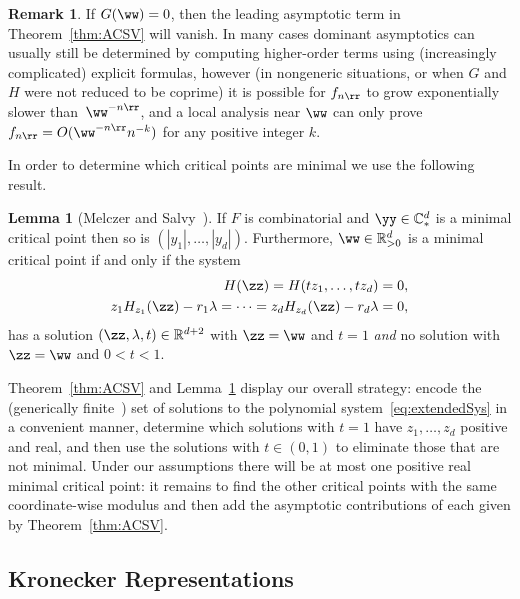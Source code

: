\documentclass[a4paper]{amsart}
\theoremstyle{definition}
\newtheorem{remark}[theorem]{Remark}
\newtheorem{lemma}[theorem]{Lemma}
\newcommand{\C}{{\mathbb C}}
\newcommand{\R}{{\mathbb R}}
\begin{document}
\begin{remark}
    If $G(\ww)=0$, then the leading asymptotic term in Theorem~\ref{thm:ACSV} will vanish. In many cases dominant asymptotics can usually still be determined by computing higher-order terms using (increasingly complicated) explicit formulas, however (in nongeneric situations, or when $G$ and $H$ were not reduced to be coprime) it is possible for $f_{n\rr}$ to grow exponentially slower than~$\ww^{-n\rr}$, and a local analysis near $\ww$ can only prove $f_{n\rr} = O(\ww^{-n\rr}n^{-k})$ for any positive integer $k$.
\end{remark}

In order to determine which critical points are minimal we use the following result.

\begin{lemma}[Melczer and Salvy~\cite{MelczerSalvy2021}]
    \label{lem:combmin}
    If $F$ is combinatorial and $\yy\in\C_*^d$ is a minimal critical point then so is $(|y_1|,\dots,|y_d|)$. Furthermore, $\ww \in \R_{>0}^d$ is a minimal critical point if and only if the system
    \begin{equation}
        \begin{split}
            H(\zz) = H(tz_1,\dots,tz_d) &= 0, \\
            z_1H_{z_1}(\zz)-r_1\lambda = \cdots = z_dH_{z_d}(\zz)-r_d\lambda &= 0,
        \end{split}
        \label{eq:extendedSys}
    \end{equation}
    has a solution $(\zz,\lambda,t) \in \R^{d+2}$ with $\zz=\ww$ and $t=1$ \emph{and} no solution with $\zz=\ww$ and $0 < t < 1$.
\end{lemma}

Theorem~\ref{thm:ACSV} and Lemma~\ref{lem:combmin} display our overall strategy: encode the (generically finite~\cite[Section~5.3.4]{Melczer2021}) set of solutions to the polynomial system~\eqref{eq:extendedSys} in a convenient manner, determine which solutions with $t=1$ have $z_1,\dots,z_d$ positive and real, and then use the solutions with $t \in (0,1)$ to eliminate those that are not minimal. Under our assumptions there will be at most one positive real minimal critical point: it remains to find the other critical points with the same coordinate-wise modulus and then add the asymptotic contributions of each given by Theorem~\ref{thm:ACSV}.

\subsection{Kronecker Representations}
\end{document}
